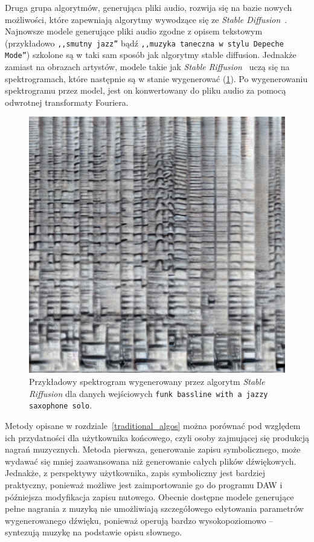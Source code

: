 Druga grupa algorytmów, generująca pliki audio, rozwija się na bazie nowych możliwości,
które zapewniają algorytmy wywodzące się ze \textit{Stable Diffusion}~\cite{stablediffusion}.
Najnowsze modele generujące pliki audio zgodne z opisem tekstowym 
(przykładowo \texttt{,,smutny jazz''} bądź \texttt{,,muzyka taneczna w stylu Depeche Mode''})
szkolone są w taki sam sposób jak algorytmy stable diffusion. 
Jednakże zamiast na obrazach artystów, modele takie jak \textit{Stable Riffusion}~\cite{riffusion} 
uczą się na spektrogramach, które następnie są w stanie wygenerować (\ref{fig:riffusion_spectro}).
Po wygenerowaniu spektrogramu przez model,
jest on konwertowany do pliku audio za pomocą odwrotnej transformaty Fouriera.

\begin{figure}[H]
    \centering
    \includegraphics[width=0.4\linewidth]{rys01/riffusion_spectro.jpg}
    \caption{
      Przykładowy spektrogram wygenerowany przez algorytm \textit{Stable Riffusion}
      dla danych wejściowych \texttt{funk bassline with a jazzy saxophone solo}.
    }\label{fig:riffusion_spectro}
\end{figure}


Metody opisane w rozdziale~\ref{traditional_algos} można porównać pod względem ich przydatności
dla użytkownika końcowego, czyli osoby zajmującej się produkcją nagrań muzycznych. Metoda pierwsza, 
generowanie zapisu symbolicznego, może wydawać się mniej zaawansowana niż generowanie całych plików dźwiękowych.
Jednakże, z perspektywy użytkownika, zapis symboliczny jest bardziej praktyczny,
ponieważ możliwe jest zaimportowanie go do programu DAW i późniejsza modyfikacja zapisu nutowego.
Obecnie dostępne modele generujące pełne nagrania z muzyką nie umożliwiają
szczegółowego edytowania parametrów wygenerowanego dźwięku, ponieważ operują bardzo wysokopoziomowo 
-- syntezują muzykę na podstawie opisu słownego.

